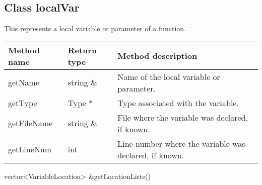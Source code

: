 \subsection{Class localVar}\label{localVar}
This represents a local variable or parameter of a function.


\begin{tabular}{p{1.25in}p{1in}p{3.25in}}
	Method name & Return type & Method description \\
	\hline
	getName & string \& & Name of the local variable or parameter. \\
	getType & Type * & Type associated with the variable. \\
	getFileName & string \& & File where the variable was declared, if known. \\
	getLineNum & int & Line number where the variable was declared, if known. \\
\end{tabular}

\begin{apient}
vector<VariableLocation> &getLocationLists()
\end{apient}
